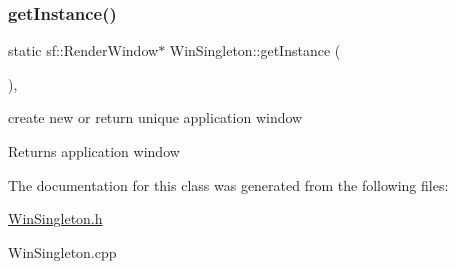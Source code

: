 \subsubsection{\texorpdfstring{get\+Instance()}{getInstance()}}
{\footnotesize\ttfamily static sf\+::\+Render\+Window$\ast$ Win\+Singleton\+::get\+Instance (\begin{DoxyParamCaption}{ }\end{DoxyParamCaption})\hspace{0.3cm}{\ttfamily [inline]}, {\ttfamily [static]}}



create new or return unique application window 

\begin{DoxyReturn}{Returns}
application window 
\end{DoxyReturn}


The documentation for this class was generated from the following files\+:\begin{DoxyCompactItemize}
\item 
\hyperlink{_win_singleton_8h}{Win\+Singleton.\+h}\item 
Win\+Singleton.\+cpp\end{DoxyCompactItemize}
